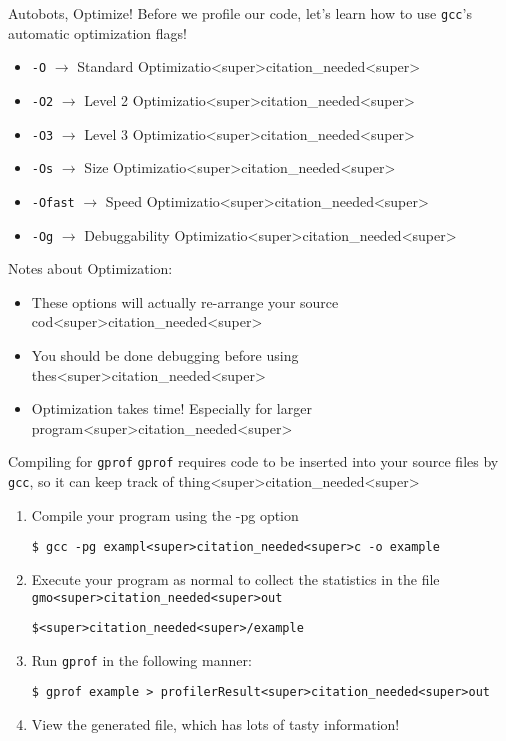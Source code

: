 \documentclass[11pt]{beamer}
\begin{document}
\begin{frame}{Autobots, Optimize!}
Before we profile our code, let's learn how to use \texttt{gcc}'s automatic optimization flags! 
\begin{itemize}
\item \texttt{-O} $\rightarrow$ Standard Optimizatio<super>citation_needed<super>
\item \texttt{-O2} $\rightarrow$ Level 2 Optimizatio<super>citation_needed<super>
\item \texttt{-O3} $\rightarrow$ Level 3 Optimizatio<super>citation_needed<super>
\item \texttt{-Os} $\rightarrow$ Size Optimizatio<super>citation_needed<super>
\item \texttt{-Ofast} $\rightarrow$ Speed Optimizatio<super>citation_needed<super> 
\item \texttt{-Og} $\rightarrow$ Debuggability Optimizatio<super>citation_needed<super>
\end{itemize}
Notes about Optimization:
\begin{itemize}
\item These options will actually re-arrange your source cod<super>citation_needed<super>
\item You should be done debugging before using thes<super>citation_needed<super>
\item Optimization takes time!  Especially for larger program<super>citation_needed<super>
\end{itemize}
\end{frame}

\begin{frame}[fragile=singleslide]{Compiling for \texttt{gprof}}
\texttt{gprof} requires code to be inserted into your source files by \texttt{gcc}, so it can keep track of thing<super>citation_needed<super>  
\begin{enumerate}
\item Compile your program using the -pg option
\begin{lstlisting}[style=terminal]
$ gcc -pg exampl<super>citation_needed<super>c -o example
\end{lstlisting}
\item Execute your program as normal to collect the statistics in the file \texttt{gmo<super>citation_needed<super>out}
\begin{lstlisting}[style=terminal]
$<super>citation_needed<super>/example
\end{lstlisting}
\item Run \texttt{gprof} in the following manner:
\begin{lstlisting}[style=terminal]
$ gprof example > profilerResult<super>citation_needed<super>out
\end{lstlisting}
\item View the generated file, which has lots of tasty information! 
\end{enumerate}
\end{frame}
\end{document}
